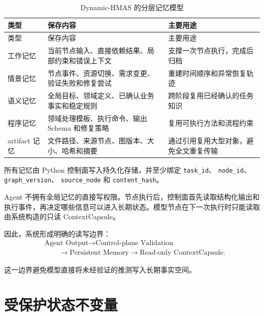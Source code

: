 \documentclass[UTF8,a4paper,12pt,oneside]{ctexbook}
\begin{document}
\begin{longtable}{p{}p{}p{}}
\caption{Dynamic-HMAS 的分层记忆模型}
\label{tab:memory-types}\\
\toprule
类型 & 保存内容 & 主要用途\\
\midrule
\endfirsthead

\toprule
类型 & 保存内容 & 主要用途\\
\midrule
\endhead

工作记忆
& 当前节点输入、直接依赖结果、局部约束和错误上下文
& 支撑一次节点执行，完成后归档\\

情景记忆
& 节点事件、资源切换、需求变更、验证失败和修复尝试
& 重建时间顺序和异常恢复轨迹\\

语义记忆
& 全局目标、领域定义、已确认业务事实和稳定规则
& 跨阶段复用已经确认的任务知识\\

程序记忆
& 领域处理模板、执行命令、输出 Schema 和修复策略
& 复用可执行方法和流程约束\\

artifact 记忆
& 文件路径、来源节点、图版本、大小、哈希和摘要
& 通过引用复用大型对象，避免全文重复传输\\

\bottomrule
\end{longtable}

所有记忆由 Python 控制面写入持久化存储，并至少绑定
\texttt{task\_id}、
\texttt{node\_id}、
\texttt{graph\_version}、
\texttt{source\_node}
和
\texttt{content\_hash}。

Agent 不拥有全局记忆的直接写权限。节点执行后，控制面首先读取结构化输出和执行事件，再决定哪些信息可以进入长期状态。模型节点在下一次执行时只能读取由系统构造的只读 ContextCapsule。

因此，系统形成明确的读写边界：
\[
\begin{aligned}
&\text{Agent Output}
\rightarrow \text{Control-plane Validation} \\[3pt]
&\qquad\rightarrow \text{Persistent Memory}
\rightarrow \text{Read-only ContextCapsule}.
\end{aligned}
\]

这一边界避免模型直接将未经验证的推测写入长期事实空间。


\section{受保护状态不变量}
\end{document}
